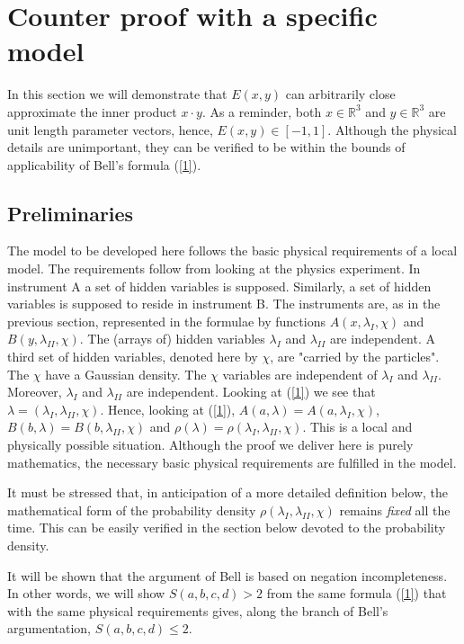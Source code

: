\documentclass{appolb}
\begin{document}
\section{Counter proof with a specific model}\label{Prel}
In this section we will demonstrate that $E(x,y)$ can arbitrarily close approximate the inner product $x \cdot y$.  As a reminder, both $x\in\mathbb{R}^3$ and $y\in\mathbb{R}^3$ are unit length parameter vectors, hence, $E(x,y)\in[-1,1]$. Although the physical details are unimportant, they can be verified to be within the bounds of applicability of Bell's formula (\ref{1}). 

\subsection{Preliminaries}
The model to be developed here follows the basic physical requirements of a local model. The requirements follow from looking at the physics experiment. In instrument A a set of hidden variables is supposed. Similarly, a set of hidden variables is supposed to reside in instrument B. 
The instruments are, as in the previous section, represented in the formulae by functions $A(x,\lambda_{I},\chi)$ and $B(y,\lambda_{II},\chi)$. 
The (arrays of) hidden variables $\lambda_{I}$ and $\lambda_{II}$ are independent. 
A third set of hidden variables, denoted here by $\chi$, are "carried by the particles". 
The $\chi$ have a Gaussian density. 
The $\chi$ variables are independent of $\lambda_{I}$ and $\lambda_{II}$. 
Moreover,  $\lambda_{I}$ and $\lambda_{II}$ are independent. 
Looking at (\ref{1}) we see that $\lambda=(\lambda_{I},\lambda_{II},\chi)$. 
Hence, looking at (\ref{1}), $A(a,\lambda)=A(a,\lambda_{I},\chi)$, $B(b,\lambda)=B(b,\lambda_{II},\chi)$ and $\rho(\lambda)=\rho(\lambda_{I},\lambda_{II},\chi)$. 
This is a local and physically possible situation. 
Although the proof we deliver here is purely mathematics, the necessary basic physical requirements are fulfilled in the model. 

It must be stressed that, in anticipation of a more detailed definition below, the mathematical form of the probability density $\rho(\lambda_{I},\lambda_{II},\chi)$ remains {\it fixed} all the time. 
This can be easily verified in the section below devoted to the probability density. 

It will be shown that the argument of Bell is based on negation incompleteness. In other words, we will show $S(a,b,c,d)> 2$  from the same formula (\ref{1}) that with the same physical requirements gives, along the branch of Bell's argumentation, $S(a,b,c,d)\leq 2$. 
\end{document}
